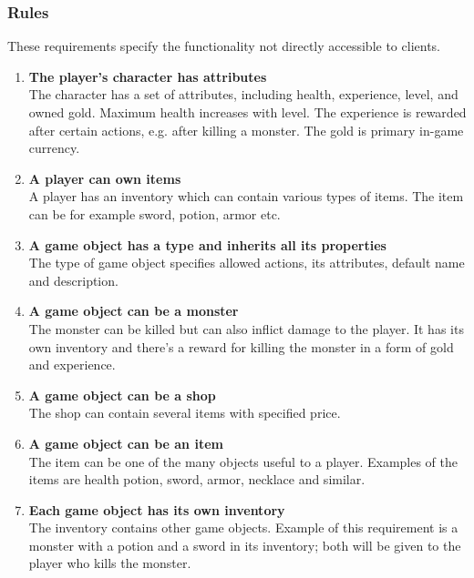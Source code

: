 		\subsubsection*{Rules}
		These requirements specify the functionality not directly accessible to clients.
		\begin{enumerate}						
			\item \textbf{The player's character has attributes} \\
			The character has a set of attributes, including health, experience, level, and owned gold. Maximum health increases with level. The experience is rewarded after certain actions, e.g. after killing a monster. The gold is primary in-game currency.
			  
			\item \textbf{A player can own items} \\
			A player has an inventory which can contain various types of items. The item can be for example sword, potion, armor etc.
			
			\item \textbf{A game object has a type and inherits all its properties} \\
			The type of game object specifies allowed actions, its attributes, default name and description.			
			
			\item \textbf{A game object can be a monster} \\
			The monster can be killed but can also inflict damage to the player. It has its own inventory and there's a reward for killing the monster in a form of gold and experience.
			
			\item \textbf{A game object can be a shop} \\
			The shop can contain several items with specified price.  
			
			\item \textbf{A game object can be an item} \\	
			The item can be one of the many objects useful to a player. Examples of the items are health potion, sword, armor, necklace and similar.
			
			\item \textbf{Each game object has its own inventory} \\
			The inventory contains other game objects. Example of this requirement is a monster with a potion and a sword in its inventory; both will be given to the player who kills the monster.  
			

\end{enumerate}
